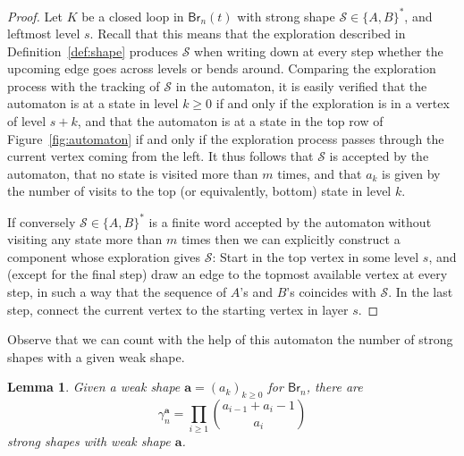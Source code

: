 \documentclass[a4paper,11pt,reqno]{amsart}
\newcommand{\paul}[1]{\todo[color=yellow!70,inline]{Paul: #1}}
\newcommand{\fabian}[1]{\todo[color=red!50,inline]{Fabian: #1}}
\newcommand{\Br}{\mathsf{Br}}
\newcommand{\shape}{\mathscr{S}}
\newcommand{\mb}{\mathbf}
\newtheorem{lemma}{Lemma}
\theoremstyle{definition}
\begin{document}
\begin{proof}
 Let $K$ be a closed loop in $\Br_n(t)$ with strong shape $\shape\in\{A,B\}^*$, and leftmost level $s$. Recall that this means that the exploration described in Definition~\ref{def:shape} produces $\shape$ when writing down at every step whether the upcoming edge goes across levels or bends around. Comparing the exploration process with the tracking of $\shape$ in the automaton, it is easily verified that the automaton is at a state in level $k\geq0$ if and only if the exploration is in a vertex of level $s+k$, and that the automaton is at a state in the top row of Figure~\ref{fig:automaton} if and only if the exploration process passes through the current vertex coming from the left. 
 It thus follows that $\shape$ is accepted by the automaton, that no state is visited more than $m$ times, and that $a_k$ is given by the number of visits to the top (or equivalently, bottom) state in level $k$.  
 
 If conversely $\shape\in\{A,B\}^*$ is a finite word accepted by the automaton without visiting any state more than $m$ times then we can explicitly construct a component whose exploration gives $\shape$: Start in the top vertex in some level $s$, and (except for the final step) draw an edge to the topmost available vertex at every step, in such a way that the sequence of $A$'s and $B$'s coincides with $\shape$. In the last step, connect the current vertex to the starting vertex in layer $s$. 
\end{proof} 

Observe that we can count with the help of this automaton the number of strong shapes with a given weak shape.

\begin{lemma}\label{lemma:gammana}
 Given a weak shape $\mb{a}=(a_k)_{k\geq0}$ for $\Br_n$, there are 
 \[
  \gamma_n^{\mb a} = \prod_{i\geq1} \binom{a_{i-1}+a_i-1}{a_i}
 \]
 strong shapes with weak shape $\mb a$.
\end{lemma}

\end{document}
